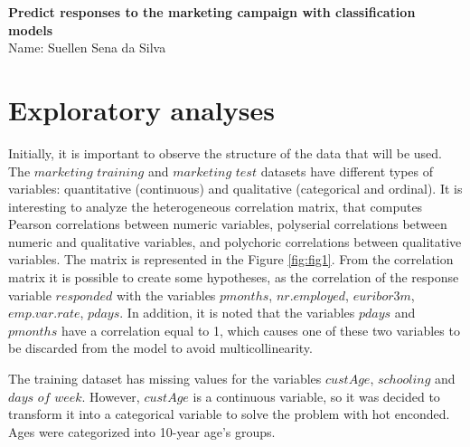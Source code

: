 \documentclass[12pt,]{article}
\author{}
\date{\vspace{-2.5em}}
\begin{document}
\renewcommand{\appendixpagename}{\huge \selectfont Apêndice}
\renewcommand{\appendixname}{Apêndice}
\renewcommand{\appendixtocname}{Apêndice}

\setlength{\columnsep}{1cm}

\providecommand{\keywords}[1]{\def\and{{\textperiodcentered} }
\par\addvspace\baselineskip
\noindent\keywordname\enspace\ignorespaces #1}

\begin{center} 


{\bf \Large Predict responses to the marketing campaign with classification models}\\[0.5cm]
{\large Name: Suellen Sena da Silva} \\[1cm]      

\end{center}

\hypertarget{exploratory-analyses}{%
\section{Exploratory analyses}\label{exploratory-analyses}}

\quad Initially, it is important to observe the structure of the data
that will be used. The \(marketing\) \(training\) and \(marketing\)
\(test\) datasets have different types of variables: quantitative
(continuous) and qualitative (categorical and ordinal). It is
interesting to analyze the heterogeneous correlation matrix, that
computes Pearson correlations between numeric variables, polyserial
correlations between numeric and qualitative variables, and polychoric
correlations between qualitative variables. The matrix is represented in
the Figure \ref{fig:fig1}. From the correlation matrix it is possible to
create some hypotheses, as the correlation of the response variable
\(responded\) with the variables \(pmonths\), \(nr.employed\),
\(euribor3m\), \(emp.var.rate\), \(pdays\). In addition, it is noted
that the variables \(pdays\) and \(pmonths\) have a correlation equal to
1, which causes one of these two variables to be discarded from the
model to avoid multicollinearity.

\quad The training dataset has missing values for the variables
\(custAge\), \(schooling\) and \(days\) \(of\) \(week\). However,
\(custAge\) is a continuous variable, so it was decided to transform it
into a categorical variable to solve the problem with hot enconded. Ages
were categorized into 10-year age's groups.
\end{document}
